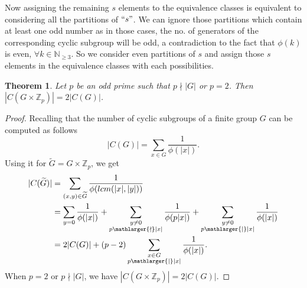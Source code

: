 \documentclass[a4paper,11pt]{amsart}
\numberwithin{equation}{section}
\numberwithin{equation}{subsection}
\newtheorem{theorem}{Theorem}[section]
\begin{document}
\begin{center}
\end{center}
Now assigning the remaining $s$ elements to the equivalence classes  is equivalent to considering all the partitions of $``s"$. We can ignore those partitions which contain at least one odd number as in those cases, the no. of generators of the corresponding cyclic subgroup will be odd, a contradiction to the fact that $\phi(k)$ is even,  $\forall k\in \mathbb{N}_{\geq 3}$. 
So we consider even partitions of $s$ and assign those $s$ elements in the equivalence classes with each possibilities.
\\

\begin{theorem}\label{|G|/p}
Let $p$ be an odd prime  such that $p \nmid |G|$ or $p=2$.  Then $|C(G\times \mathbb{Z}_{p})|=2|C(G)|$.
\end{theorem}
\begin{proof}
   Recalling that the number of cyclic subgroups of a finite group $G$ can be computed as
follows  $$|C(G)|=\sum_{x\in G}\frac{1}{\phi(|x|)}.$$ Using it for $\widetilde{G}=G\times\mathbb{Z}_{p}$, we get 
\begin{equation*}
    \begin{aligned}
        |C(\widetilde{G})|&=\sum_{(x,y)\in \widetilde{G}} \frac{1}{\phi(lcm(|x|,|y|))}\\
        &= \sum_{y=0} \frac{1}{\phi(|x|)}+\sum_{\substack{y\neq 0\\ p \mathlarger{\nmid} |x|}} \frac{1}{\phi(p|x|)}+ \sum_{\substack{y\neq 0\\ p \mathlarger{\mid} |x|}} \frac{1}{\phi(|x|)}\\ &=2|C(G)|+(p-2)\sum_{\substack{x\in G \\ p \mathlarger{\mid} |x|}} \frac{1}{\phi(|x|)}.
    \end{aligned}
\end{equation*}
 When $p=2$ or $p\nmid |G|$, we have $|C(G\times \mathbb{Z}_{p})|=2|C(G)|$. 
\end{proof}
\end{document}
